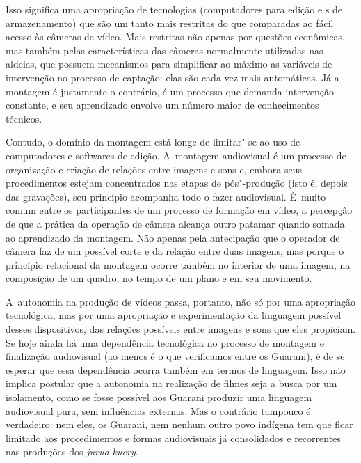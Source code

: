 Isso significa uma apropriação de tecnologias (computadores para edição
e s de armazenamento) que são um tanto mais restritas do que
comparadas ao fácil acesso às câmeras de vídeo. Mais restritas não
apenas por questões econômicas, mas também pelas características das
câmeras normalmente utilizadas nas aldeias, que possuem mecanismos para
simplificar ao máximo as variáveis de intervenção no processo de
captação: elas são cada vez mais automáticas. Já a montagem é
justamente o contrário, é um processo que demanda intervenção
constante, e seu aprendizado envolve um número maior de conhecimentos
técnicos.

Contudo, o domínio da montagem está longe de limitar"-se ao uso de
computadores e softwares de edição. A~montagem audiovisual é um
processo de organização e criação de relações entre imagens e sons e,
embora seus procedimentos estejam concentrados nas etapas de
pós"-produção (isto é, depois das gravações), seu princípio acompanha
todo o fazer audiovisual. É~muito comum entre os participantes de um
processo de formação em vídeo, a percepção de que a prática da operação
de câmera alcança outro patamar quando somada ao aprendizado da
montagem. Não apenas pela antecipação que o operador de câmera faz de
um possível corte e da relação entre duas imagens, mas porque o
princípio relacional da montagem ocorre também no interior de uma
imagem, na composição de um quadro, no tempo de um plano e em seu
movimento.

A~autonomia na produção de vídeos passa, portanto, não só por uma
apropriação tecnológica, mas por uma apropriação e experimentação da
linguagem possível desses dispositivos, das relações possíveis entre
imagens e sons que eles propiciam. Se hoje ainda há uma dependência
tecnológica no processo de montagem e finalização audiovisual (ao menos
é o que verificamos entre os Guarani), é de se esperar que essa
dependência ocorra também em termos de linguagem. Isso não implica
postular que a autonomia na realização de filmes seja a busca por um
isolamento, como se fosse possível aos Guarani produzir uma linguagem
audiovisual pura, sem influências externas. Mas o contrário tampouco é
verdadeiro: nem eles, os Guarani, nem nenhum outro povo indígena tem
que ficar limitado aos procedimentos e formas audiovisuais já
consolidados e recorrentes nas produções dos \emph{jurua kuery}.


